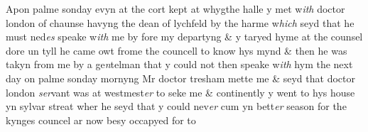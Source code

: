 \documentclass[12pt, a4paper]{book}
\begin{document}
		\ifthenelse{\isodd{\thepage}}
		{\reversemarginpar}
		{\normalmarginpar}
		Apon palme sonday evyn at the cort kept at whygthe halle y met w\textit{ith} doctor london of chaunse havyng the dean of lychfeld by the harme w\textit{hich} seyd that he must ned\textit{es} speake w\textit{ith} me by fore my departyng \& y taryed hyme at the counsel dore un tyll he came owt frome the councell to know hys mynd \& then he was takyn from me by a ge\textit{n}telman that y could not then
			 speake w\textit{ith} hym the next day on palme sonday mornyng Mr doctor tresham mette me \& seyd that doctor london \textit{ser}vant was at westmest\textit{er} to seke me \& continently y went to hys house yn sylvar streat wher he seyd that y could nev\textit{er} cum yn bett\textit{er} season for the kynges councel ar now besy occapyed for to
	
	
		
				\marginpar[\vspace{0.5cm}{\textcolor{Gray}{manicule}}]{}
			
\end{document}
